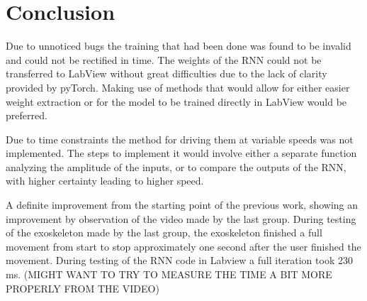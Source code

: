 \section{Conclusion}


Due to unnoticed bugs the training that had been done was found to be invalid and could not be rectified in time.
The
weights of the RNN could not be transferred to LabView without great difficulties due to the lack of clarity provided by
pyTorch. Making use of methods that would allow for either easier weight extraction or for the model to be trained
directly in LabView would be preferred.


Due to time constraints the method for driving them at variable speeds was not implemented. The steps to implement it
would involve either a separate function analyzing the amplitude of the inputs, or to compare the outputs of the RNN,
with higher certainty leading to higher speed.


A definite improvement from the starting point of the previous work, showing an improvement by observation of the video made by the last group. During testing of the exoskeleton made by the last group,
 the exoskeleton finished a full movement from start to stop approximately one second after the user finished the movement. During testing of the RNN code in Labview a full iteration took 230 ms. (MIGHT WANT TO TRY TO MEASURE THE TIME A BIT MORE
PROPERLY FROM THE VIDEO)


